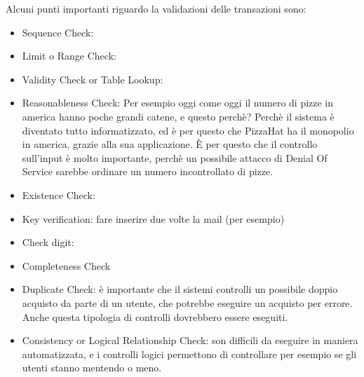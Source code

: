 Alcuni punti importanti riguardo la validazioni delle transazioni sono:
\begin{itemize}
\item Sequence Check:
\item Limit o Range Check:
\item Validity Check or Table Lookup:
\item Reasonableness Check: 
Per esempio oggi come oggi il numero di pizze in america hanno poche grandi 
catene, e questo perchè? Perchè il sistema è diventato tutto informatizzato, ed 
è per questo che PizzaHat ha il monopolio in america, grazie alla sua 
applicazione. È per questo che il controllo sull'input è molto importante, 
perchè un possibile attacco di Denial Of Service sarebbe ordinare un numero 
incontrollato di pizze.
\item Existence Check:
\item Key verification: fare inserire due volte la mail (per esempio)
\item Check digit:
\item Completeness Check
\item Duplicate Check: è importante che il sistemi controlli un possibile doppio 
acquisto da parte di un utente, che potrebbe eseguire un acquisto per errore. 
Anche questa tipologia di controlli dovrebbero essere eseguiti.
\item Consistency or Logical Relationship Check: son difficili da eseguire in 
maniera automatizzata, e i controlli logici permettono di controllare per 
esempio se gli utenti stanno mentendo o meno. 
\end{itemize}
